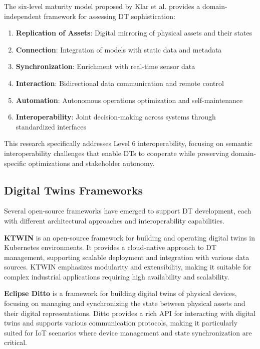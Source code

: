 The six-level maturity model proposed by Klar et al. \cite{Klar_2024} provides a domain-independent framework for assessing DT sophistication:
\begin{enumerate}
    \item \textbf{Replication of Assets}: Digital mirroring of physical assets and their states
    \item \textbf{Connection}: Integration of models with static data and metadata
    \item \textbf{Synchronization}: Enrichment with real-time sensor data
    \item \textbf{Interaction}: Bidirectional data communication and remote control
    \item \textbf{Automation}: Autonomous operations optimization and self-maintenance
    \item \textbf{Interoperability}: Joint decision-making across systems through standardized interfaces
\end{enumerate}

This research specifically addresses Level 6 interoperability,
    focusing on semantic interoperability challenges that enable DTs to cooperate while 
    preserving domain-specific optimizations and stakeholder autonomy.

\subsection{Digital Twins Frameworks}

Several open-source frameworks have emerged to support DT development, each with different architectural approaches and interoperability capabilities.

\textbf{KTWIN} is an open-source framework for building and operating digital twins in Kubernetes environments. It provides a cloud-native approach to DT management, supporting scalable deployment and integration with various data sources. KTWIN emphasizes modularity and extensibility, making it suitable for complex industrial applications requiring high availability and scalability.

\textbf{Eclipse Ditto} is a framework for building digital twins of physical devices, focusing on managing and synchronizing the state between physical assets and their digital representations. Ditto provides a rich API for interacting with digital twins and supports various communication protocols, making it particularly suited for IoT scenarios where device management and state synchronization are critical.

